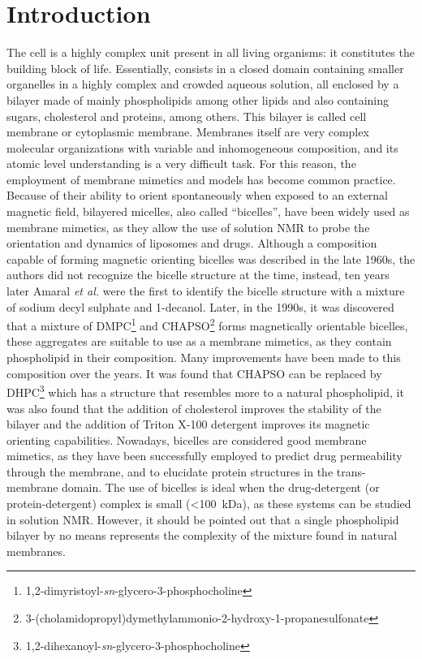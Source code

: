 \documentclass[3p,preprint,review]{elsarticle}
\begin{document}
	\section{Introduction}
	The cell is a highly complex unit present in all living organisms: it
	constitutes the building block of life. Essentially, consists in a closed
	domain
	containing smaller organelles in a highly complex and crowded aqueous solution,
	all enclosed by a bilayer made of mainly phospholipids among other lipids and
  also containing sugars, cholesterol and proteins, among others. This bilayer is called
	cell membrane or cytoplasmic membrane. Membranes itself are very complex
	molecular organizations with variable and inhomogeneous composition, and its
	atomic level understanding is a very difficult task. For this reason, the
	employment of
	membrane mimetics and models has become common practice.\cite{Bondar2019}\\
	Because of their ability to orient spontaneously when exposed to an external
	magnetic field, bilayered micelles, also called ``bicelles'', have been widely
	used as membrane mimetics, as they allow the use of solution NMR to probe the
	orientation and dynamics of liposomes and
	drugs\cite{Beaugrand2016,Montecinos2007,Ruiz-Fernandez2016}. Although a
	composition capable of forming magnetic orienting bicelles was described in the
	late 1960s\cite{Lawson1967}, the authors did not recognize the bicelle structure
	at the time, instead, ten years later Amaral \textit{et al.} were the first to
	identify the bicelle structure
	with a mixture of sodium decyl sulphate and
	1-decanol\cite{Amaral1979}. Later,
	in the 1990s, it was discovered that a
	mixture of DMPC\footnote{1,2-dimyristoyl-\textit{sn}-glycero-3-phosphocholine}
	and
	CHAPSO\footnote{3-(cholamidopropyl)dymethylammonio-2-hydroxy-1-propanesulfonate}
	forms magnetically orientable bicelles\cite{Sanders1990}, these aggregates are
	suitable to use as a membrane mimetics, as they contain
	phospholipid in their composition. Many improvements have been made to this
	composition over the years. It was found that CHAPSO can be replaced by
	DHPC\footnote{1,2-dihexanoyl-\textit{sn}-glycero-3-phosphocholine} which has a
	structure that resembles more to a natural phospholipid\cite{Sanders1992}, it
	was also found
	that the addition of cholesterol improves the stability of the
	bilayer\cite{Shapiro2010} and
	the addition of Triton X-100 detergent improves its magnetic orienting
	capabilities\cite{Park2010}. Nowadays, bicelles are considered good membrane
	mimetics, as they have been successfully employed to predict drug permeability
	through the membrane\cite{Sun2008,Durr2013,Matsumori2007,Koenig2005}, and to
	elucidate
	protein structures in the trans-membrane domain\cite{Durr2012}. The use of
	bicelles is ideal when
	the
	drug-detergent (or protein-detergent) complex is small (<\SI{100}{kDa}), as
	these systems can be studied in solution
	NMR\cite{Warschawski2011,Raschle2010,Sanders2006}. However, it should be
	pointed out that a single phospholipid bilayer by no means represents the
	complexity of the mixture found in natural membranes.\\
	
\end{document}
